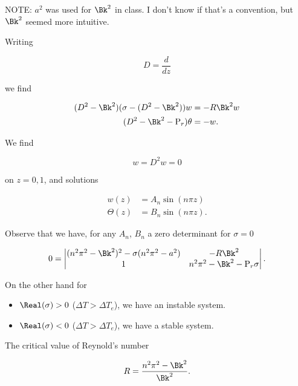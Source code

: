 NOTE: $a^2$ was used for $\Bk^2$ in class.  I don't know if that's a convention, but $\Bk^2$ seemed more intuitive.

Writing

\begin{equation}\label{eqn:continuumL22:570}
D = \frac{d}{dz}
\end{equation}

we find

\begin{align}\label{eqn:continuumL22:450}
(D^2 - \Bk^2) ( \sigma - (D^2 - \Bk^2) ) w &= -R \Bk^2 w \\
(D^2 - \Bk^2 -\text{P}_r ) \theta &= - w.
\end{align}

We find

\begin{equation}\label{eqn:continuumL22:590}
w = D^2 w = 0
\end{equation}

on $z = 0,1$, and solutions

\begin{align}\label{eqn:continuumL22:470}
w(z) &= A_n \sin( n \pi z ) \\
\Theta(z) &= B_n \sin( n \pi z ).
\end{align}

Observe that we have, for any $A_n$, $B_n$ a zero determinant for $\sigma = 0$

\begin{equation}\label{eqn:continuumL22:490}
0 = 
\begin{vmatrix}
(n^2 \pi^2 - \Bk^2)^2 - \sigma (n^2 \pi^2 - a^2) & -R \Bk^2 \\
1 & n^2 \pi^2 - \Bk^2 - \text{P}_r \sigma
\end{vmatrix}.
\end{equation}

On the other hand for
\begin{itemize}
\item $\Real(\sigma) > 0$ ($\Delta T > \Delta T_e$), we have an instable system.
\item $\Real(\sigma) < 0$ ($\Delta T > \Delta T_e$), we have a stable system.
\end{itemize}

The critical value of Reynold's number

\begin{equation}\label{eqn:continuumL22:510}
R = \frac{n^2 \pi^2 - \Bk^2}{\Bk^2}.
\end{equation}

